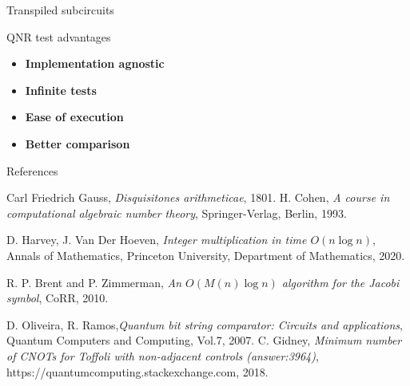 \documentclass[final]{beamer}
\newlength{\colwidth}
\begin{document}
\begin{frame}[t]
\begin{columns}[t]
\begin{column}{\colwidth}
\begin{block}{Transpiled subcircuits}
  \end{block}
  \begin{exampleblock}{QNR test advantages}
\begin{itemize}
  \item {\bf Implementation agnostic}
  \item {\bf Infinite tests} 
  \item {\bf Ease of execution}
  \item {\bf Better comparison}
\end{itemize}
  \end{exampleblock}


  \begin{block}{References}
    {\fontsize{15pt}{15pt}\selectfont
\begin{thebibliography}{100} %
   Carl Friedrich Gauss, \emph{Disquisitones arithmeticae}, 1801.
   H. Cohen, \emph{A course in computational algebraic number theory}, Springer-Verlag, Berlin, 1993.

   D. Harvey, J. Van Der Hoeven, \emph{{Integer multiplication in time $O(n \log n)$}}, {{Annals of Mathematics}}, {{Princeton University, Department of Mathematics}}, 2020.

 R. P. Brent and P. Zimmerman, \emph{An {$O(M(n) \log n)$} algorithm for the Jacobi symbol}, {CoRR}, 2010.

     {D. Oliveira, R. Ramos},\emph{Quantum bit string comparator: Circuits and applications}, {Quantum Computers and Computing}, Vol.7, 2007.
   C. Gidney, \emph{Minimum number of CNOTs for Toffoli with non-adjacent controls (answer:3964)}, {https://quantumcomputing.stackexchange.com}, 2018. 
\end{thebibliography}
}
  \end{block}


\end{column}
\end{columns}
\end{frame}
\end{document}
